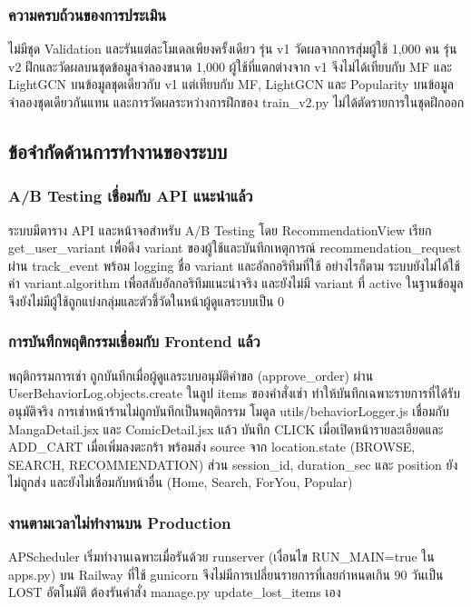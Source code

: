 \subsubsection{ความครบถ้วนของการประเมิน}
ไม่มีชุด Validation และรันแต่ละโมเดลเพียงครั้งเดียว รุ่น v1 วัดผลจากการสุ่มผู้ใช้ 1,000 คน รุ่น v2 ฝึกและวัดผลบนชุดข้อมูลจำลองขนาด 1,000 ผู้ใช้ที่แตกต่างจาก v1 จึงไม่ได้เทียบกับ MF และ LightGCN บนข้อมูลชุดเดียวกับ v1 แต่เทียบกับ MF, LightGCN และ Popularity บนข้อมูลจำลองชุดเดียวกันแทน และการวัดผลระหว่างการฝึกของ train\_v2.py ไม่ได้ตัดรายการในชุดฝึกออก 

\subsection{ข้อจำกัดด้านการทำงานของระบบ}

\subsubsection{A/B Testing เชื่อมกับ API แนะนำแล้ว}
ระบบมีตาราง API และหน้าจอสำหรับ A/B Testing โดย RecommendationView เรียก get\_user\_variant เพื่อดึง variant ของผู้ใช้และบันทึกเหตุการณ์ recommendation\_request ผ่าน track\_event พร้อม logging ชื่อ variant และอัลกอริทึมที่ใช้ อย่างไรก็ตาม ระบบยังไม่ได้ใช้ค่า variant.algorithm เพื่อสลับอัลกอริทึมแนะนำจริง และยังไม่มี variant ที่ active ในฐานข้อมูล จึงยังไม่มีผู้ใช้ถูกแบ่งกลุ่มและตัวชี้วัดในหน้าผู้ดูแลระบบเป็น 0

\subsubsection{การบันทึกพฤติกรรมเชื่อมกับ Frontend แล้ว}
พฤติกรรมการเช่า ถูกบันทึกเมื่อผู้ดูแลระบบอนุมัติคำขอ (approve\_order) ผ่าน UserBehaviorLog.objects.create ในลูป items ของคำสั่งเช่า ทำให้บันทึกเฉพาะรายการที่ได้รับอนุมัติจริง การเช่าหน้าร้านไม่ถูกบันทึกเป็นพฤติกรรม โมดูล utils/behaviorLogger.js เชื่อมกับ MangaDetail.jsx และ ComicDetail.jsx แล้ว บันทึก CLICK เมื่อเปิดหน้ารายละเอียดและ ADD\_CART เมื่อเพิ่มลงตะกร้า พร้อมส่ง source จาก location.state (BROWSE, SEARCH, RECOMMENDATION) ส่วน session\_id, duration\_sec และ position ยังไม่ถูกส่ง และยังไม่เชื่อมกับหน้าอื่น (Home, Search, ForYou, Popular)

\subsubsection{งานตามเวลาไม่ทำงานบน Production}
APScheduler เริ่มทำงานเฉพาะเมื่อรันด้วย runserver (เงื่อนไข RUN\_MAIN=true ใน apps.py) บน Railway ที่ใช้ gunicorn จึงไม่มีการเปลี่ยนรายการที่เลยกำหนดเกิน 90 วันเป็น LOST อัตโนมัติ ต้องรันคำสั่ง manage.py update\_lost\_items เอง

